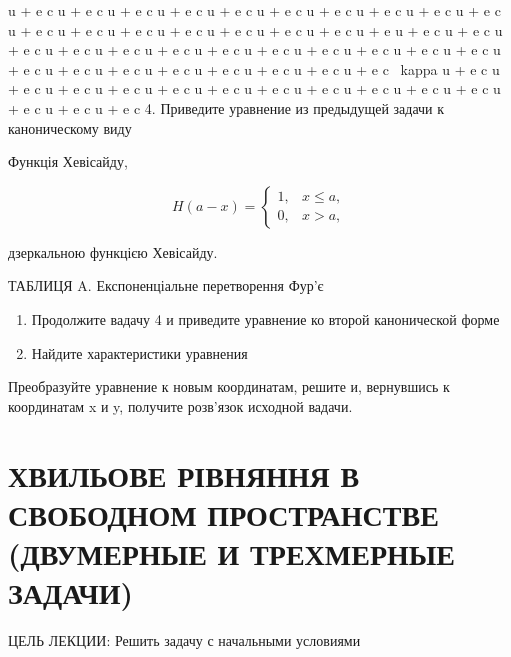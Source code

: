 \documentclass[
  ukrainian,
]{article}
\begin{document}
\kappa u + e c \kappa u + e c \kappa u + e c \kappa u + e c \kappa u + e
c \kappa u + e c \kappa u + e c \kappa u + e c \kappa u + e c \kappa u +
e c \kappa u + e c \kappa u + e c \kappa u + e c \kappa u + e c \kappa u
+ e c \kappa u + e c \kappa u + e c \kappa u + e u + e c \kappa u + e c
\kappa u + e c \kappa u + e c \kappa u + e c \kappa u + e c \kappa u + e
c \kappa u + e c \kappa u + e c \kappa u + e c \kappa u + e c \kappa u +
e c \kappa u + e c \kappa u + e c \kappa u + e c \kappa u + e c \kappa u
+ e c \kappa u + e c \kappa u + e c \kappa u + e c ~kappa u + e c
\kappa u + e c \kappa u + e c \kappa u + e c \kappa u + e c \kappa u + e
c \kappa u + e c \kappa u + e c \kappa u + e c \kappa u + e c \kappa u +
e c \kappa u + e c \kappa u + e c \kappa u + e c 4. Приведите уравнение
из предыдущей задачи к каноническому виду

Функція Хевісайду,

\[
H(a-x) = \begin{cases} 1, & x \leqslant a, \\ 0, & x > a, \end{cases}
\]

дзеркальною функцією Хевісайду.

ТАБЛИЦЯ A. Експоненціальне перетворення Фур'є

\begin{enumerate}
\def\labelenumi{\arabic{enumi}.}
\setcounter{enumi}{4}
\item
  Продолжите вадачу 4 и приведите уравнение ко второй канонической форме
\item
  Найдите характеристики уравнения
\end{enumerate}

Преобразуйте уравнение к новым координатам, решите и, вернувшись к
координатам x и y, получите розв'язок исходной вадачи.

\section{ХВИЛЬОВЕ РІВНЯННЯ В СВОБОДНОМ ПРОСТРАНСТВЕ (ДВУМЕРНЫЕ И
ТРЕХМЕРНЫЕ
ЗАДАЧИ)}\label{ux445ux432ux438ux43bux44cux43eux432ux435-ux440ux456ux432ux43dux44fux43dux43dux44f-ux432-ux441ux432ux43eux431ux43eux434ux43dux43eux43c-ux43fux440ux43eux441ux442ux440ux430ux43dux441ux442ux432ux435-ux434ux432ux443ux43cux435ux440ux43dux44bux435-ux438-ux442ux440ux435ux445ux43cux435ux440ux43dux44bux435-ux437ux430ux434ux430ux447ux438}

ЦЕЛЬ ЛЕКЦИИ: Решить задачу с начальными условиями
\end{document}
